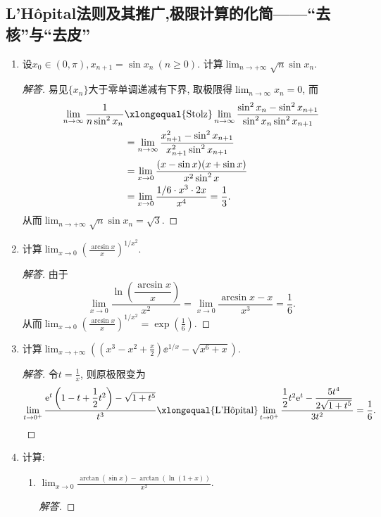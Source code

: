 \subsection{L'H\^{o}pital法则及其推广,极限计算的化简------``去核''与``去皮''}
\begin{2a}
\begin{enumerate}
\item 设\(x_0\in(0,\pi),x_{n+1}=\sin x_n\ (n\geqslant 0)\). 
计算\(\lim_{n\rightarrow+\infty}\sqrt{n}\sin x_n\).
\begin{proof}[解答]
易见\(\{x_n\}\)大于零单调递减有下界, 取极限得\(\lim_{n\rightarrow\infty}x_n=0\), 而
\begin{align*}
\lim_{n\rightarrow\infty}\frac{1}{n\sin^2 x_n}
&\xlongequal{\text{Stolz}}\lim_{n\rightarrow\infty}\frac{\sin^2x_n-\sin^2x_{n+1}}{\sin^2x_n\sin^2x_{n+1}}\\
&=\lim_{n\rightarrow\infty}\frac{x_{n+1}^2-\sin^2x_{n+1}}{x_{n+1}^2\sin^2x_{n+1}}\\
&=\lim_{x\rightarrow 0}\frac{(x-\sin x)(x+\sin x)}{x^2\sin^2x}\\
&=\lim_{x\rightarrow 0}\frac{1/6\cdot x^3\cdot 2x}{x^4}=\frac{1}{3}.
\end{align*}
从而\(\lim_{n\rightarrow+\infty}\sqrt{n}\sin x_n=\sqrt{3}\).
\end{proof}
\item 计算\(\lim_{x\rightarrow 0}\left(\frac{\arcsin x}{x}\right)^{1/x^2}\).
\begin{proof}[解答]
由于\[\lim_{x\rightarrow 0}\frac{\ln\left(\dfrac{\arcsin x}{x}\right)}{x^2}
=\lim_{x\rightarrow 0}\frac{\arcsin x-x}{x^3}=\frac{1}{6}.\]
从而\(\lim_{x\rightarrow 0}\left(\frac{\arcsin x}{x}\right)^{1/x^2}
=\exp\left(\frac{1}{6}\right)\).
\end{proof}
\item 计算\(\lim_{x\rightarrow+\infty}\left(\left(x^3-x^2+\frac{x}{2}\right)\ee^{1/x}-\sqrt{x^6+x}\right)\).
\begin{proof}[解答]
令\(t=\frac{1}{x}\), 则原极限变为
\[\lim_{t\rightarrow0^+}\frac{\ee^t\left(1-t+\dfrac{1}{2}t^2\right)-\sqrt{1+t^5}}{t^3}\xlongequal{\text{L'H\^{o}pital}}\lim_{t\rightarrow 0^+}\frac{\dfrac{1}{2}t^2\ee^t-\dfrac{5t^4}{2\sqrt{1+t^5}}}{3t^2}=\frac{1}{6}.\qedhere\]
\end{proof}
\item 计算:
\begin{enumerate}[label=(\arabic*)]
\item \(\lim_{x\rightarrow 0}\frac{\arctan(\sin x)-\arctan(\ln (1+x))}{x^2}\).
\begin{proof}[解答]

\end{proof}
\end{enumerate}
\end{enumerate}
\end{2a}
